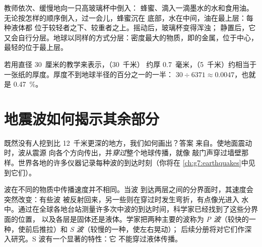 \begin{inthelab}
教师依次、缓慢地向一只高玻璃杯中倒入：
蜂蜜、滴入一滴墨水的水和食用油。
无论按怎样的顺序倒入，过一会儿，蜂蜜沉在
底部，水在中间，油在最上层：每种液体都
位于较轻者之下、较重者之上。摇动后，玻璃杯变得浑浊；
静置后，它又会自行分层。地球以同样的方式分层：密度最大的物质，即的金属，位于中心，最轻的位于最上层。
\end{inthelab}


\begin{remark}[地壳到底有多薄？]\label{rem:g6:inside-the-earth:thin-crust}
若用直径 30~厘米的教学来表示，（30~千米）
约厚 0.7~毫米，（5~千米）约相当于
一张纸的厚度。厚度不到地球半径的百分之一的一半：
$30 \div 6371 \approx 0.0047$，也就是 0.47~\%。
\end{remark}

\section{地震波如何揭示其余部分}\label{sec:g6:inside-the-earth:waves}

既然没有人挖到比 12~千米更深的地方，我们如何画出？答案
来自。使地面震动时，波从震源
向各个方向传出，并\emph{穿过}整个地球传播，就像
敲门声穿过墙壁那样。世界各地的许多仪器记录每种波的到达时刻（你将在
\cref{ch:g7:earthquakes}中见到它们）。

波在不同的物质中传播速度并不相同。当波
到达两层之间的分界面时，其速度会突然改变：有些波
被反射回来，另一些则在穿过时发生弯折，有点像光进入
水中。通过在全球各地台站测量许多次中波的到达时间，科学家已经找到了这些分界面的位置，
以及各层是固体还是液体。学家把两种主要的波称为
\emph{P 波}（较快的一种，使前后推拉）和
\emph{S 波}（较慢的一种，使左右晃动）；
后续分册将对它们作深入研究。S 波有一个显著的特性：它
不能穿过液体传播。

